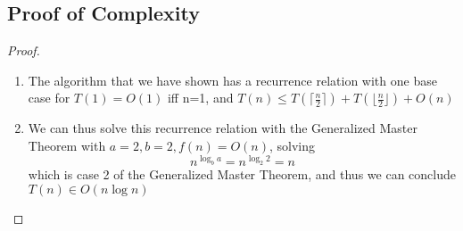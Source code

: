 \documentclass{article}
\begin{document}
\subsection{Proof of Complexity}
\begin{proof}
      \begin{enumerate}
            \item The algorithm that we have shown has a recurrence relation with one base case for
                  \(T(1)=O(1)\) iff n=1, and \(T(n) \leq T(\lceil \frac{n}{2} \rceil) + T(\lfloor
                  \frac{n}{2}\rfloor)
                  + O(n)\)
            \item We can thus solve this recurrence relation with the Generalized Master Theorem with \(a=2, b=2, f(n) =
                  O(n)\), solving \[n^{\log_b a} = n^{\log_2 2} = n \] which is case 2 of
                  the Generalized
                  Master Theorem, and thus we can conclude \(T(n) \in O(n \log n)\)
      \end{enumerate}
\end{proof}
\end{document}
